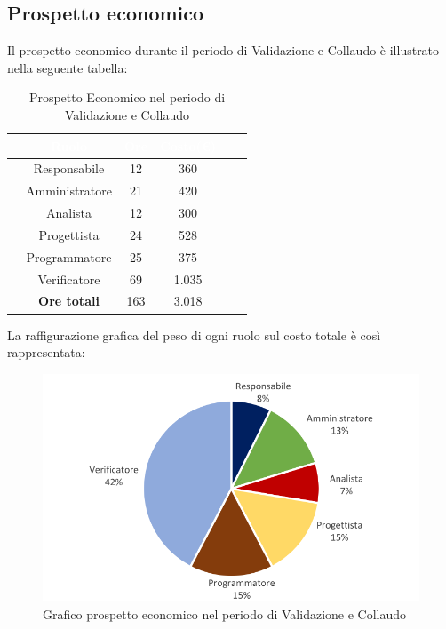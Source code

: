 \subsection{Prospetto economico}
Il prospetto economico durante il periodo di Validazione e Collaudo è illustrato nella seguente tabella:

\begin{table}[ht]
	\begin{center}
		\begin{tabular}{cccccc}
			\rowcolor{coolblack}
			\hline
			&\textcolor{white}{Ruolo}&	\textcolor{white}{Ore} &\textcolor{white}{Costo(\euro)} \\
			\hline
			&Responsabile           &12&360\\
			&Amministratore        & 21& 420 \\
			&Analista                   & 12& 300\\
			&Progettista              &  24& 528\\
			&Programmatore       & 25& 375 \\
			&Verificatore             & 69& 1.035\\
			\hline
			&\textbf{Ore totali}    &163&3.018\\
		\end{tabular}
		\caption{Prospetto Economico nel periodo di Validazione e Collaudo}
	\end{center}
\end{table}

La raffigurazione grafica del peso di ogni ruolo sul costo totale è così rappresentata:
\begin{figure}[!ht]
	\begin{center}
		\includegraphics{images/grafoValidazioneCollaudoEuro.png}
		\caption{Grafico prospetto economico nel periodo di Validazione e Collaudo}
	\end{center}
\end{figure}
\newpage
